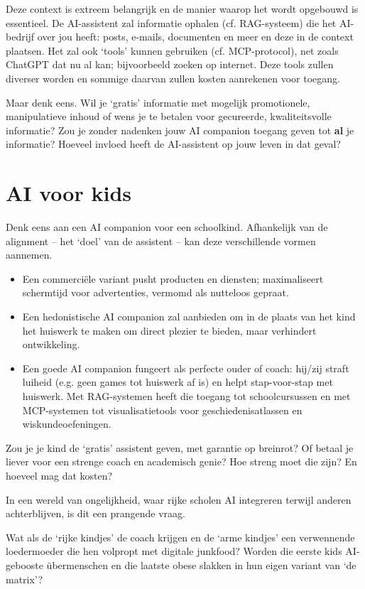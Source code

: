 \documentclass[twocolumn]{article}
\begin{document}
Deze context is extreem belangrijk en de manier waarop het wordt opgebouwd is essentieel.
De AI-assistent zal informatie ophalen (cf. RAG-systeem) die het AI-bedrijf over jou heeft: posts, e-mails, documenten en meer en deze in de context plaatsen.
Het zal ook `tools' kunnen gebruiken (cf. MCP-protocol), net zoals ChatGPT dat nu al kan; bijvoorbeeld zoeken op internet.
Deze tools zullen diverser worden en sommige daarvan zullen kosten aanrekenen voor toegang.

Maar denk eens.
Wil je `gratis' informatie met mogelijk promotionele, manipulatieve inhoud of wens je te betalen voor gecureerde, kwaliteitsvolle informatie?
Zou je zonder nadenken jouw AI companion toegang geven tot \textbf{al} je informatie?
Hoeveel invloed heeft de AI-assistent op jouw leven in dat geval?

\section*{AI voor kids}

Denk eens aan een AI companion voor een schoolkind.
Afhankelijk van de alignment -- het `doel' van de assistent -- kan deze verschillende vormen aannemen.

\begin{itemize}\itemsep=0pt
  \item Een commerciële variant pusht producten en diensten; maximaliseert schermtijd voor advertenties, vermomd als nutteloos gepraat.
  \item Een hedonistische AI companion zal aanbieden om in de plaats van het kind het huiswerk te maken om direct plezier te bieden, maar verhindert ontwikkeling.
  \item Een goede AI companion fungeert als perfecte ouder of coach: hij/zij straft luiheid (e.g. geen games tot huiswerk af is) en helpt stap-voor-stap met huiswerk. Met RAG-systemen heeft die toegang tot schoolcursussen en met MCP-systemen tot visualisatietools voor geschiedenisatlassen en wiskundeoefeningen.
\end{itemize}

Zou je je kind de `gratis' assistent geven, met garantie op breinrot?
Of betaal je liever voor een strenge coach en academisch genie?
Hoe streng moet die zijn?
En hoeveel mag dat kosten?

In een wereld van ongelijkheid, waar rijke scholen AI integreren terwijl anderen achterblijven, is dit een prangende vraag.

Wat als de `rijke kindjes' de coach krijgen en de `arme kindjes' een verwennende loedermoeder die hen volpropt met digitale junkfood?
Worden die eerste kids AI-gebooste übermenschen en die laatste obese slakken in hun eigen variant van `de matrix'?
\end{document}
